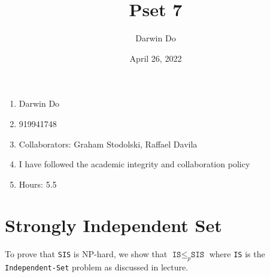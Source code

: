 \documentclass{article}
\title{Pset 7}
\begin{document}
\newcommand{\Not}{\textbf{not}}
\newcommand{\AAnd}{\textbf{and}}
\newcommand{\Or}{\textbf{or}}
\newcommand{\True}{\texttt{True}}
\newcommand{\False}{\texttt{False}}

\date{April 26, 2022 }
\author{Darwin Do}

\maketitle

\begin{enumerate}
    \item Darwin Do
    \item 919941748
    \item Collaborators: Graham Stodolski, Raffael Davila
    \item I have followed the academic integrity and collaboration policy
    \item Hours: 5.5
\end{enumerate}

\newpage

\section{Strongly Independent Set}

To prove that \texttt{SIS} is NP-hard, we show that $\texttt{IS} \leq_p \texttt{SIS}$ where \texttt{IS} is the \texttt{Independent-Set} problem as discussed in lecture.
\end{document}

